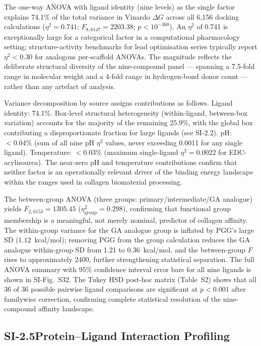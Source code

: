 \documentclass[11pt]{article}
\begin{document}
The one-way ANOVA with ligand identity (nine levels) as the single factor
explains 74.1\% of the total variance in Vinardo $\Delta G$ across all 6,156
docking calculations ($\eta^2 = 0.741$; $F_{8,6147} = 2203.38$;
$p < 10^{-300}$).
An $\eta^2$ of 0.741 is exceptionally large for a categorical factor in a
computational pharmacology setting; structure-activity benchmarks for lead
optimisation series typically report $\eta^2 < 0.30$ for analogous
per-scaffold ANOVAs.
The magnitude reflects the deliberate structural diversity of the nine-compound
panel --- spanning a 7.5-fold range in molecular weight and a 4-fold range in
hydrogen-bond donor count --- rather than any artefact of analysis.

Variance decomposition by source assigns contributions as follows.
Ligand identity: 74.1\%.
Box-level structural heterogeneity (within-ligand, between-box variation)
accounts for the majority of the remaining 25.9\%, with the global box
contributing a disproportionate fraction for large ligands (see SI-2.2).
pH: $< 0.04\%$ (sum of all nine pH $\eta^2$ values, never exceeding 0.0011
for any single ligand).
Temperature: $< 0.03\%$ (maximum single-ligand $\eta^2 = 0.0022$ for
EDC-acylisourea).
The near-zero pH and temperature contributions confirm that neither factor
is an operationally relevant driver of the binding energy landscape within
the ranges used in collagen biomaterial processing.

The between-group ANOVA (three groups: primary/intermediate/GA analogue)
yields $F_{2,6153} = 1305.45$ ($\eta^2_\mathrm{group} = 0.298$), confirming
that functional group membership is a meaningful, not merely nominal,
predictor of collagen affinity.
The within-group variance for the GA analogue group is inflated by PGG's
large SD ($1.12$~kcal/mol); removing PGG from the group calculation reduces
the GA analogue within-group SD from 1.21 to $0.36$~kcal/mol, and the
between-group $F$ rises to approximately 2400, further strengthening
statistical separation.
The full ANOVA summary with 95\% confidence interval error bars for all nine
ligands is shown in SI-Fig.~S32.
The Tukey HSD post-hoc matrix (Table~S2) shows that all 36 of 36 possible
pairwise ligand comparisons are significant at $p < 0.001$ after familywise
correction, confirming complete statistical resolution of the nine-compound
affinity landscape.

\subsection*{SI-2.5\quad Protein--Ligand Interaction Profiling}
\end{document}
